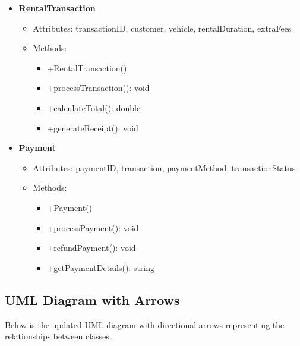 \documentclass{article}
\begin{document}
\begin{itemize}
    \item \textbf{RentalTransaction}
        \begin{itemize}
            \item Attributes: transactionID, customer, vehicle, rentalDuration, extraFees
            \item Methods: 
            \begin{itemize}
                \item +RentalTransaction()
                \item +processTransaction(): void
                \item +calculateTotal(): double
                \item +generateReceipt(): void
            \end{itemize}
        \end{itemize}
    
    \item \textbf{Payment}
        \begin{itemize}
            \item Attributes: paymentID, transaction, paymentMethod, transactionStatus
            \item Methods: 
            \begin{itemize}
                \item +Payment()
                \item +processPayment(): void
                \item +refundPayment(): void
                \item +getPaymentDetails(): string
            \end{itemize}
        \end{itemize}
\end{itemize}

\newpage

\subsection{UML Diagram with Arrows}
Below is the updated UML diagram with directional arrows representing the relationships between classes. 
\end{document}

